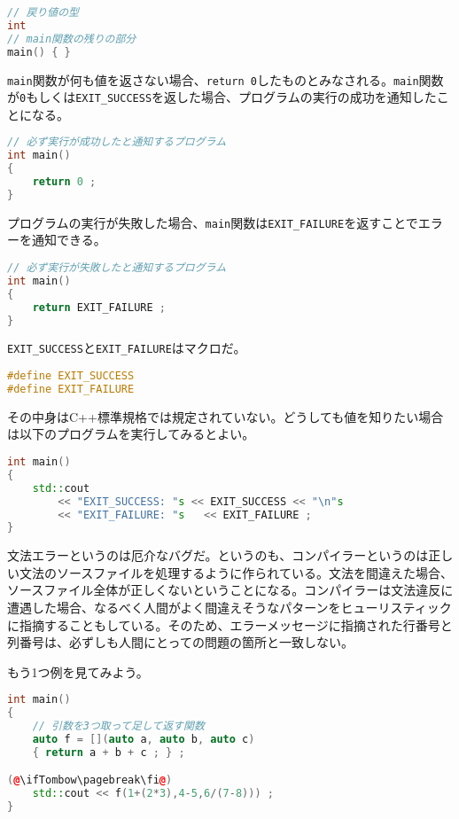 \begin{lstlisting}[language={C++}]
// 戻り値の型
int
// main関数の残りの部分
main() { }
\end{lstlisting}

\texttt{main}関数が何も値を返さない場合、\texttt{return 0}したものとみなされる。\texttt{main}関数が\texttt{0}もしくは\texttt{EXIT\_SUCCESS}を返した場合、プログラムの実行の成功を通知したことになる。

\begin{lstlisting}[language={C++}]
// 必ず実行が成功したと通知するプログラム
int main()
{
    return 0 ;
}
\end{lstlisting}

プログラムの実行が失敗した場合、\texttt{main}関数は\texttt{EXIT\_FAILURE}を返すことでエラーを通知できる。

\begin{lstlisting}[language={C++}]
// 必ず実行が失敗したと通知するプログラム
int main()
{
    return EXIT_FAILURE ;
}
\end{lstlisting}

\texttt{EXIT\_SUCCESS}と\texttt{EXIT\_FAILURE}はマクロだ。

\begin{lstlisting}[language=c++]
#define EXIT_SUCCESS
#define EXIT_FAILURE
\end{lstlisting}

その中身はC++標準規格では規定されていない。どうしても値を知りたい場合は以下のプログラムを実行してみるとよい。

\begin{lstlisting}[language={C++}]
int main()
{
    std::cout
        << "EXIT_SUCCESS: "s << EXIT_SUCCESS << "\n"s
        << "EXIT_FAILURE: "s   << EXIT_FAILURE ;  
}
\end{lstlisting}

文法エラーというのは厄介なバグだ。というのも、コンパイラーというのは正しい文法のソースファイルを処理するように作られている。文法を間違えた場合、ソースファイル全体が正しくないということになる。コンパイラーは文法違反に遭遇した場合、なるべく人間がよく間違えそうなパターンをヒューリスティックに指摘することもしている。そのため、エラーメッセージに指摘された行番号と列番号は、必ずしも人間にとっての問題の箇所と一致しない。

もう1つ例を見てみよう。

\begin{lstlisting}[language=c++]
int main()
{
    // 引数を3つ取って足して返す関数
    auto f = [](auto a, auto b, auto c)
    { return a + b + c ; } ;

(@\ifTombow\pagebreak\fi@)
    std::cout << f(1+(2*3),4-5,6/(7-8))) ;
}
\end{lstlisting}

